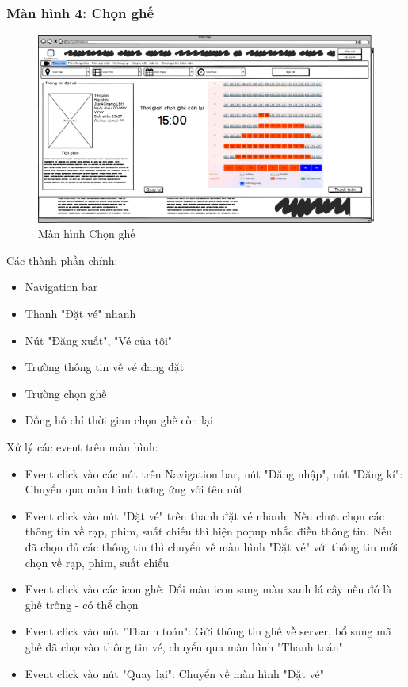 \documentclass[a4paper, 12pt]{article}
\begin{document}
		\subsubsection{Màn hình 4: Chọn ghế}
			\begin{figure}[H]
				\begin{center}
					\includegraphics[scale = 0.25]{Wireframe/User/Chọn ghế.png}
					\caption{Màn hình Chọn ghế}
				\end{center}
			\end{figure}
			Các thành phần chính: 
			\begin{itemize}
				\item Navigation bar
				\item Thanh "Đặt vé" nhanh
				\item Nút "Đăng xuất", "Vé của tôi"
				\item Trường thông tin về vé đang đặt
				\item Trường chọn ghế
				\item Đồng hồ chỉ thời gian chọn ghế còn lại
			\end{itemize}
			Xử lý các event trên màn hình:
			\begin{itemize}
				\item Event click vào các nút trên Navigation bar, nút "Đăng nhập", nút "Đăng kí": Chuyển qua màn hình tương ứng với tên nút
				\item Event click vào nút "Đặt vé" trên thanh đặt vé nhanh: Nếu chưa chọn các thông tin về rạp, phim, suất chiếu thì hiện popup nhắc điền thông tin. Nếu đã chọn đủ các thông tin thì chuyển về màn hình "Đặt vé" với thông tin mới chọn về rạp, phim, suất chiếu
				\item Event click vào các icon ghế: Đổi màu icon sang màu xanh lá cây nếu đó là ghế trống - có thể chọn
				\item Event click vào nút "Thanh toán": Gửi thông tin ghế về server, bổ sung mã ghế đã chọnvào thông tin vé, chuyển qua màn hình "Thanh toán"
				\item Event click vào nút "Quay lại": Chuyển về màn hình "Đặt vé"
			\end{itemize}
\end{document}
